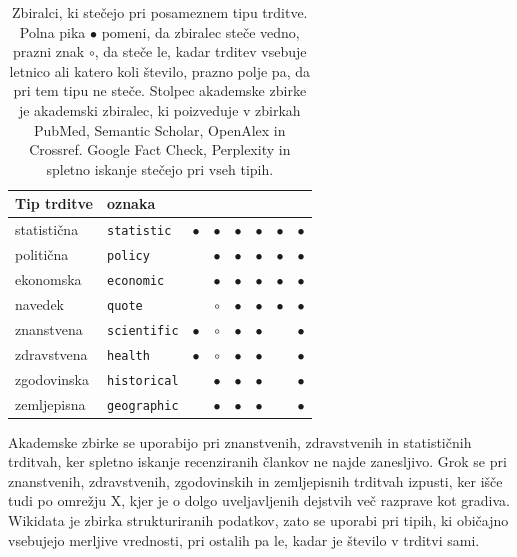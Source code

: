 \documentclass[a4paper, 12pt]{book}
\newcommand{\rot}[1]{\rotatebox{90}{\small #1}} %
\begin{document}
\begin{table}[H]
\centering
\small
{}
\begin{tabular}{@{}llcccccc@{}}
\toprule
Tip trditve & oznaka & \rot{akademske zbirke} & \rot{Wikidata} &
\rot{Google Fact Check} & \rot{Perplexity} & \rot{Grok} & \rot{spletno iskanje} \\
\midrule
statistična & \texttt{statistic} & $\bullet$ & $\bullet$ & $\bullet$ & $\bullet$ & $\bullet$ & $\bullet$ \\
politična & \texttt{policy} &  & $\bullet$ & $\bullet$ & $\bullet$ & $\bullet$ & $\bullet$ \\
ekonomska & \texttt{economic} &  & $\bullet$ & $\bullet$ & $\bullet$ & $\bullet$ & $\bullet$ \\
navedek & \texttt{quote} &  & $\circ$ & $\bullet$ & $\bullet$ & $\bullet$ & $\bullet$ \\
znanstvena & \texttt{scientific} & $\bullet$ & $\circ$ & $\bullet$ & $\bullet$ &  & $\bullet$ \\
zdravstvena & \texttt{health} & $\bullet$ & $\circ$ & $\bullet$ & $\bullet$ &  & $\bullet$ \\
zgodovinska & \texttt{historical} &  & $\bullet$ & $\bullet$ & $\bullet$ &  & $\bullet$ \\
zemljepisna & \texttt{geographic} &  & $\bullet$ & $\bullet$ & $\bullet$ &  & $\bullet$ \\
\bottomrule
\end{tabular}
\caption{Zbiralci, ki stečejo pri posameznem tipu trditve. Polna pika
$\bullet$ pomeni, da zbiralec steče vedno, prazni znak $\circ$, da steče le, kadar trditev vsebuje letnico ali katero koli število, prazno polje pa, da pri tem tipu ne steče. Stolpec akademske zbirke je akademski zbiralec, ki poizveduje v zbirkah PubMed, Semantic Scholar, OpenAlex in Crossref. Google Fact Check, Perplexity in spletno iskanje stečejo pri vseh tipih.}
\label{tbl:usmerjanje}
\end{table}

Akademske zbirke se uporabijo pri znanstvenih, zdravstvenih in statističnih trditvah, ker spletno iskanje recenziranih člankov ne najde zanesljivo. Grok se pri znanstvenih, zdravstvenih, zgodovinskih in zemljepisnih trditvah izpusti, ker išče tudi po omrežju X, kjer je o dolgo uveljavljenih dejstvih več razprave kot gradiva. Wikidata je zbirka strukturiranih podatkov, zato se uporabi pri tipih, ki običajno vsebujejo merljive vrednosti, pri ostalih pa le, kadar je število v trditvi sami.
\end{document}
